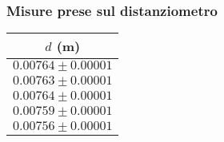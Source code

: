 \subsubsection{Misure prese sul distanziometro}
\begin{table}[H]
\centering
\begin{tabular}{|c|}
\hline
\( d \) (m) \\
\hline
\( 0.00764 \pm 0.00001 \) \\
\hline
\( 0.00763 \pm 0.00001 \) \\
\hline
\( 0.00764 \pm 0.00001 \) \\
\hline
\( 0.00759 \pm 0.00001 \) \\
\hline
\( 0.00756 \pm 0.00001 \) \\
\hline
\end{tabular}
\end{table}
